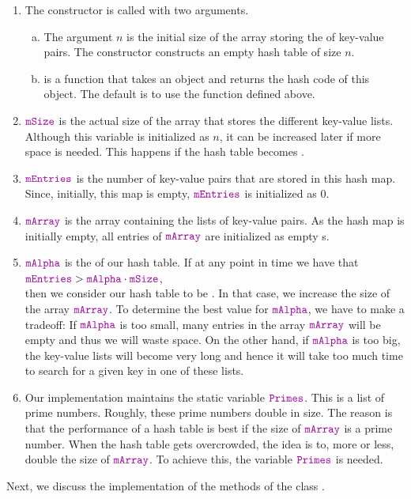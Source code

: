 \begin{enumerate}
\item The constructor  is called with two arguments.
      \begin{enumerate}[(a)]
      \item The argument $n$ is the initial size of the array storing the  of key-value
            pairs.  The constructor constructs an empty hash table of size $n$.
      \item {} is a function that takes an object and returns the hash code of this object.
            The default is to use the function  defined above.
      \end{enumerate}
\item $\mytt{mSize}$ is the actual size of the array that stores the different key-value lists.
      Although this variable is initialized as $n$, it can be increased later if more space is needed.  This happens 
      if the hash table becomes .
\item $\mytt{mEntries}$ is the number of key-value pairs that are stored in this hash map.
      Since, initially, this map is empty, $\mytt{mEntries}$ is  initialized as $0$.
\item $\mytt{mArray}$ is the array containing the lists of key-value pairs.
      As the hash map is initially empty, all entries of $\mytt{mArray}$ are initialized as empty s.
\item $\mytt{mAlpha}$ is the  of our hash table.  If at any point in time we have that
      \\[0.2cm]
      \hspace*{1.3cm}
      $\mytt{mEntries} > \mytt{mAlpha} \cdot \mytt{mSize}$,
      \\[0.2cm]
      then we consider our hash table to be .  In that case, we increase the size
      of the array $\mytt{mArray}$.  To determine the best value for $\mytt{mAlpha}$, we have to
      make a tradeoff:  If $\mytt{mAlpha}$ is too small, many entries in the array $\mytt{mArray}$
      will be empty and thus we will waste space.  On the other hand, if $\mytt{mAlpha}$ is too
      big, the key-value lists will become very long and hence it will take too much time to
      search for a given key in one of these lists.
\item Our implementation maintains the static variable $\mytt{Primes}$.  This is a list of prime numbers.
      Roughly, these prime numbers double in size.   
      The reason is that the performance of a hash table is best if the size of $\mytt{mArray}$ is a
      prime number.  When the hash table gets overcrowded, the idea is to, more or less, double
      the size of $\mytt{mArray}$.  To achieve this, the variable $\mytt{Primes}$ is needed.
\end{enumerate}
Next, we discuss the implementation of the  methods of the class .

